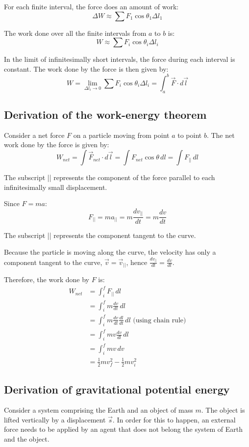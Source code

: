 \documentclass[11pt]{article}
\begin{document}
For each finite interval, the force does an amount of work:
\[\Delta W \approx \sum F_1 \cos \theta_1 \Delta l_1 \]

The work done over all the finite intervals from \(a\) to \(b\) is:
\[W \approx \sum F_i \cos \theta_i \Delta l_i\]

In the limit of infinitesimally short intervals, the force during each interval is constant. The work done by the force is then given by:
\[W = \lim_{\Delta l_i \rightarrow 0} \sum F_i \cos \theta_i \Delta l_i = \int_a^b \vec{F} \cdot d \vec{l}\]

\newpage
\subsection{Derivation of the work-energy theorem}
\label{sec:org09d0ab4}
Consider a net force \(F\) on a particle moving from point \(a\) to point \(b\). The net work done by the force is given by:
\[W_{net} = \int \vec{F}_{net} \cdot d \vec{l} = \int F_{net} \cos \theta \, dl = \int F_{||} \, dl\]

The subscript || represents the component of the force parallel to each infinitesimally small displacement.


Since \(F = ma\):
\[F_{||} = ma_{||} = m \frac{dv_{||}}{dt} = m \frac{dv}{dt}\]

The subscript || represents the component tangent to the curve.


Because the particle is moving along the curve, the velocity has only a component tangent to the curve, \(\vec{v} = \vec{v}_{||}\), hence \(\frac{dv_{||}}{dt} = \frac{dv}{dt}\).


Therefore, the work done by \(F\) is:
\begin{align*}
W_{net} &= \int_i^f F_{||} \, dl \\
&= \int_i^f m \frac{dv}{dt} \, dl \\
&= \int_i^f m \frac{dv}{dl} \frac{dl}{dt} \, dl \text{ (using chain rule)} \\
&= \int_i^f mv \frac{dv}{dl} \, dl \\
&= \int_i^f mv \, dv \\
&= \frac{1}{2}mv_f^2 - \frac{1}{2}mv_i^2
\end{align*}

\newpage
\subsection{Derivation of gravitational potential energy}
\label{sec:org594a449}
Consider a system comprising the Earth and an object of mass \(m\). The object is lifted vertically by a displacement \(\vec{s}\). In order for this to happen, an external force needs to be applied by an agent that does not belong the system of Earth and the object.
\end{document}

